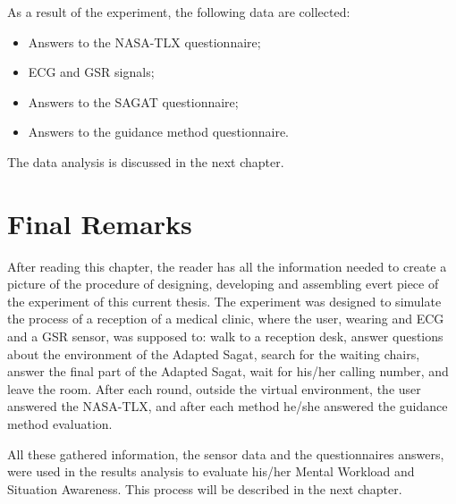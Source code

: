 As a result of the experiment, the following data are collected:

\begin{itemize}
    \item Answers to the NASA-TLX questionnaire;
    \item ECG and GSR signals;
    \item Answers to the SAGAT questionnaire;
    \item Answers to the guidance method questionnaire.
\end{itemize}

The data analysis is discussed in the next chapter.

\section{Final Remarks}

After reading this chapter, the reader has all the information needed to create a picture of the procedure of designing, developing and assembling evert piece of the experiment of this current thesis. The experiment was designed to simulate the process of a reception of a medical clinic, where the user, wearing and ECG and a GSR sensor, was supposed to: walk to a reception desk, answer questions about the environment of the Adapted Sagat, search for the waiting chairs, answer the final part of the Adapted Sagat, wait for his/her calling number, and leave the room. After each round, outside the virtual environment, the user answered the NASA-TLX, and after each method he/she answered the guidance method evaluation.

All these gathered information, the sensor data and the questionnaires answers, were used in the results analysis to evaluate his/her Mental Workload and Situation Awareness. This process will be described in the next chapter.